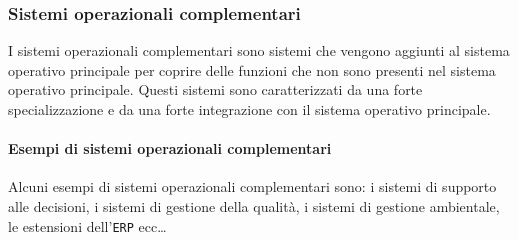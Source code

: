     \subsubsection{Sistemi operazionali complementari}
        I sistemi operazionali complementari sono sistemi che vengono aggiunti al sistema operativo principale per coprire delle funzioni che non sono presenti nel sistema operativo principale. Questi sistemi sono caratterizzati da una forte specializzazione e da una forte integrazione con il sistema operativo principale.
        \paragraph{Esempi di sistemi operazionali complementari} Alcuni esempi di sistemi operazionali complementari sono: i sistemi di supporto alle decisioni, i sistemi di gestione della qualità, i sistemi di gestione ambientale, le estensioni dell'\texttt{ERP} ecc\dots
